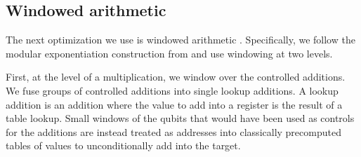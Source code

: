 \documentclass[superscriptaddress,notitlepage,longbibliography]{revtex4-1}
\theoremstyle{definition}
\theoremstyle{definition}
\begin{document}
\subsection{Windowed arithmetic}

The next optimization we use is windowed arithmetic \cite{van2005fastexponentiation,kutin2006shor,gidney2019windowedarithmetic}.
Specifically, we follow the modular exponentiation construction from \cite{gidney2019windowedarithmetic} and use windowing at two levels.

First, at the level of a multiplication, we window over the controlled additions.
We fuse groups of controlled additions into single lookup additions.
A lookup addition is an addition where the value to add into a register is the result of a table lookup.
Small windows of the qubits that would have been used as controls for the additions are instead treated as addresses into classically precomputed tables of values to unconditionally add into the target.
\end{document}
